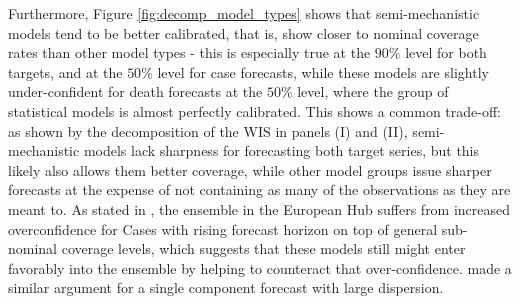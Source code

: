Furthermore, Figure \ref{fig:decomp_model_types} shows that semi-mechanistic models tend to be better calibrated, that is, show closer to nominal coverage rates than other model types - this is especially true at the $90\%$ level for both targets, and at the $50\%$ level for case forecasts, while these models are slightly under-confident for death forecasts at the $50\%$ level, where the group of statistical models is almost perfectly calibrated. This shows a common trade-off: as shown by the decomposition of the WIS in panels (I) and (II), semi-mechanistic models lack sharpness for forecasting both target series, but this likely also allows them better coverage, while other model groups issue sharper forecasts at the expense of not containing as many of the observations as they are meant to. As stated in \cite{sherratt_european_2022}, the ensemble in the European Hub suffers from increased overconfidence for Cases with rising forecast horizon on top of general sub-nominal coverage levels, which suggests that these models still might enter favorably into the ensemble by helping to counteract that over-confidence. \cite{bracher_evaluating_2021} made a similar argument for a single component forecast with large dispersion.\\ %
